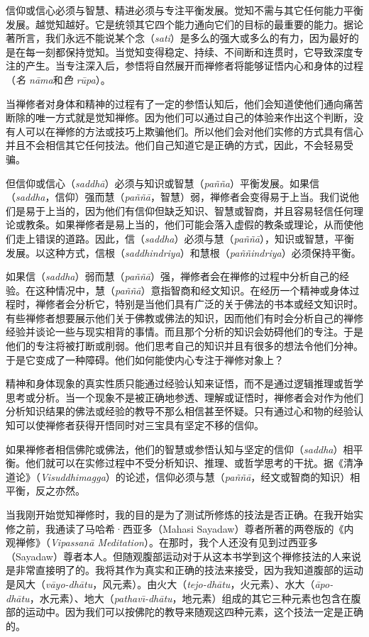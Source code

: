 信仰或信心必须与智慧、精进必须与专注平衡发展。觉知不需与其它任何能力平衡发展。越觉知越好。它是统领其它四个能力通向它们的目标的最重要的能力。据论著所言，我们永远不能说某个念（{\it sati}）是多么的强大或多么的有力，因为最好的是在每一刻都保持觉知。当觉知变得稳定、持续、不间断和连贯时，它导致深度专注的产生。当专注深入后，参悟将自然展开而禅修者将能够证悟内心和身体的过程（{\it 名 n\=ama}和{\it 色 r\=upa}）。

当禅修者对身体和精神的过程有了一定的参悟认知后，他们会知道使他们通向痛苦断除的唯一方式就是觉知禅修。因为他们可以通过自己的体验来作出这个判断，没有人可以在禅修的方法或技巧上欺骗他们。所以他们会对他们实修的方式具有信心并且不会相信其它任何技法。他们自己知道它是正确的方式，因此，不会轻易受骗。

\1但信仰或信心（{\it saddh\=a}）必须与知识或智慧（{\it pa\~n\~na}）平衡发展。如果信（{\it saddha}，信仰）强而慧（{\it pa\~n\~n\=a}，智慧）弱，禅修者会变得易于上当。我们说他们是易于上当的，因为他们有信仰但缺乏知识、智慧或智商，并且容易轻信任何理论或教条。如果禅修者是易上当的，他们可能会落入虚假的教条或理论，从而使他们走上错误的道路。因此，信（{\it saddha}）必须与慧（{\it pa\~n\~n\=a}），知识或智慧，平衡发展。以这种方式，信根（{\it saddhindriya}）和慧根（{\it pa\~n\~nindriya}）必须保持平衡。

如果信（{\it saddha}）弱而慧（{\it pa\~n\~n\=a}）强，禅修者会在禅修的过程中分析自己的经验。在这种情况中，慧（{\it pa\~n\~n\=a}）意指智商和经文知识。在经历一个精神或身体过程时，禅修者会分析它，特别是当他们具有广泛的关于佛法的书本或经文知识时。有些禅修者想要展示他们关于佛教或佛法的知识，因而他们有时会分析自己的禅修经验并谈论一些与现实相背的事情。而且那个分析的知识会妨碍他们的专注。于是他们的专注将被打断或削弱。他们思考自己的知识并且有很多的想法令他们分神。于是它变成了一种障碍。他们如何能使内心专注于禅修对象上？

精神和身体现象的真实性质只能通过经验认知来证悟，而不是通过逻辑推理或哲学思考或分析。当一个现象不是被正确地参透、理解或证悟时，禅修者会对作为他们分析知识结果的佛法或经验的教导不那么相信甚至怀疑。只有通过心和物的\1经验认知可以使禅修者获得开悟同时对三宝具有坚定不移的信仰。

如果禅修者相信佛陀或佛法，他们的智慧或参悟认知与坚定的信仰（{\it saddha}）相平衡。他们就可以在实修过程中不受分析知识、推理、或哲学思考的干扰。据《清净道论》（{\it Visuddhimagga}）的论述，信仰必须与慧（{\it pa\~n\~n\=a}，经文或智商的知识）相平衡，反之亦然。

当我刚开始觉知禅修时，我的目的是为了测试所修炼的技法是否正确。在我开始实修之前，我通读了马哈希·西亚多（Mahasi Sayadaw）尊者所著的两卷版的《内观禅修》（{\it Vipassan\=a Meditation}）。在那时，我个人还没有见到过西亚多（Sayadaw）尊者本人。但随观腹部运动对于从这本书学到这个禅修技法的人来说是非常直接明了的。我将其作为真实和正确的技法来接受，因为我知道腹部的运动是风大（{\it v\=ayo-dh\=atu}，风元素）。由火大（{\it tejo-dh\=atu}，火元素）、水大（{\it \=apo-dh\=atu}，水元素）、地大（{\it pathav\=\i-dh\=atu}，地元素）组成的其它三种元素也包含在腹部的运动中。因为我们可以按佛陀的教导来随观这四种元素，这个技法一定是正确的。

